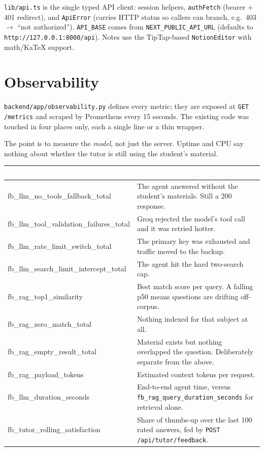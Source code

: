 \documentclass[11pt,a4paper]{article}
\newcommand{\code}[1]{\colorbox{fbCream}{\texttt{\small #1}}}
\newcommand{\hdr}[1]{\textcolor{white}{\bfseries #1}}
\begin{document}
\code{lib/api.ts} is the single typed API client: session helpers,
\code{authFetch} (bearer + 401 redirect), and \code{ApiError} (carries HTTP status
so callers can branch, e.g.\ 403 $\rightarrow$ ``not authorized''). \code{API\_BASE}
comes from \code{NEXT\_PUBLIC\_API\_URL} (defaults to
\code{http://127.0.0.1:8000/api}). Notes use the TipTap-based \code{NotionEditor}
with math/KaTeX support.

\section{Observability}\label{sec:observability}

\code{backend/app/observability.py} defines every metric; they are exposed at
\code{GET /metrics} and scraped by Prometheus every 15 seconds. The existing code
was touched in four places only, each a single line or a thin wrapper.

The point is to measure the \emph{model}, not just the server. Uptime and CPU say
nothing about whether the tutor is still using the student's material.

\begin{tabularx}{\textwidth}{>{\ttfamily\small}l L}
\toprule
{}\hdr{Metric} & \hdr{What it catches} \\
\midrule
fb\_llm\_no\_tools\_fallback\_total & The agent answered without the student's
  materials. Still a 200 response. \\
fb\_llm\_tool\_validation\_failures\_total & Groq rejected the model's tool call
  and it was retried hotter. \\
fb\_llm\_rate\_limit\_switch\_total & The primary key was exhausted and traffic
  moved to the backup. \\
fb\_llm\_search\_limit\_intercept\_total & The agent hit the hard two-search cap. \\
fb\_rag\_top1\_similarity & Best match score per query. A falling p50 means
  questions are drifting off-corpus. \\
fb\_rag\_zero\_match\_total & Nothing indexed for that subject at all. \\
fb\_rag\_empty\_result\_total & Material exists but nothing overlapped the
  question. Deliberately separate from the above. \\
fb\_rag\_payload\_tokens & Estimated context tokens per request. \\
fb\_llm\_duration\_seconds & End-to-end agent time, versus
  \code{fb\_rag\_query\_duration\_seconds} for retrieval alone. \\
fb\_tutor\_rolling\_satisfaction & Share of thumbs-up over the last 100 rated
  answers, fed by \code{POST /api/tutor/feedback}. \\
\bottomrule
\end{tabularx}
\end{document}
